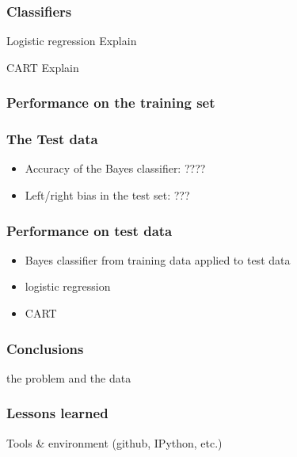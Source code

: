 \documentclass[fleqn]{beamer}
\begin{document}
\begin{frame}
\frametitle{Classifiers}

     \begin{beamerboxesrounded}{Logistic regression}
         Explain
     \end{beamerboxesrounded}
     
     \begin{beamerboxesrounded}{CART}
         Explain
      \end{beamerboxesrounded}

\end{frame}

\begin{frame}
\frametitle{Performance on the training set}

\end{frame}

\begin{frame}
\frametitle{The Test data}
    \begin{itemize}
        \item Accuracy of the Bayes classifier: ????
        \item Left/right bias in the test set: ???
    \end{itemize}

\end{frame}

\begin{frame}
\frametitle{Performance on test data}
    \begin{itemize}
        \item Bayes classifier from training data applied to test data
        \item logistic regression
        \item CART
    \end{itemize}

\end{frame}

\begin{frame}
\frametitle{Conclusions}
    the problem and the data

\end{frame}

\begin{frame}
\frametitle{Lessons learned}
   Tools \& environment (github, IPython, etc.)


\end{frame}
\end{document}
